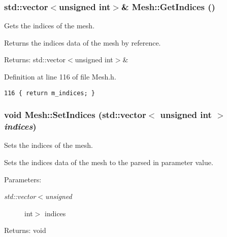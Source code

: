 \hypertarget{class_mesh_411f2f5c53f04b607d66b15450a57b9a}{
\subsubsection[GetIndices]{\setlength{\rightskip}{0pt plus 5cm}std::vector$<$unsigned int$>$\& Mesh::GetIndices ()}}
\label{class_mesh_411f2f5c53f04b607d66b15450a57b9a}


Gets the indices of the mesh. 

Returns the indices data of the mesh by reference.

\begin{Desc}
\item[Returns:]std::vector$<$unsigned int$>$\& \end{Desc}


Definition at line 116 of file Mesh.h.

\begin{Code}\begin{verbatim}116 { return m_indices; }
\end{verbatim}
\end{Code}


\hypertarget{class_mesh_632245c4ccf578208f0a75e183c68e34}{
\subsubsection[SetIndices]{\setlength{\rightskip}{0pt plus 5cm}void Mesh::SetIndices (std::vector$<$ unsigned int $>$ {\em indices})}}
\label{class_mesh_632245c4ccf578208f0a75e183c68e34}


Sets the indices of the mesh. 

Sets the indices data of the mesh to the parsed in parameter value.

\begin{Desc}
\item[Parameters:]
\begin{description}
\item[{\em std::vector$<$unsigned}]int$>$ indices \end{description}
\end{Desc}
\begin{Desc}
\item[Returns:]void \end{Desc}



